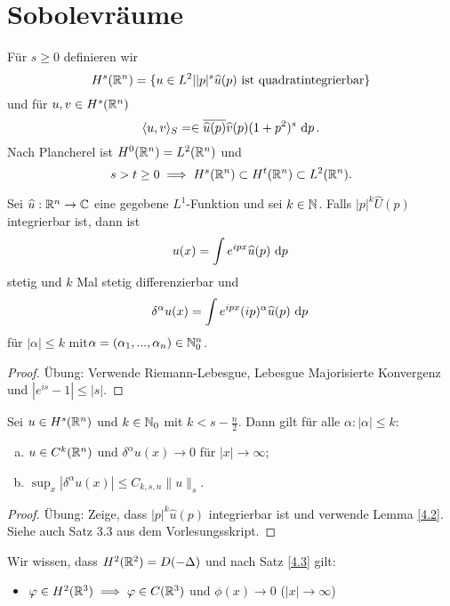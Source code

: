 \documentclass{mycourse}
\begin{document}
\section{Sobolevräume}
Für $s\ge 0$ definieren wir
\[
H^s(\R^n) = \{u \in L^2| |p|^s \hat u(p) \text{ ist quadratintegrierbar}\}
\]
und für $u,v\in H^s(\R^n)$
\[
\langle u, v \rangle_S = \in \overline{\hat u(p)} \hat v(p) (1+p^2)^s \, \dx[p].
\]
Nach Plancherel ist $H^0(\R^n)=L^2(\R^n)$ und
\[
s>t \ge 0 \implies H^s(\R^n) \subset H^t(\R^n) \subset L^2(\R^n).
\]
\begin{lem}\label{4.2}
Sei $\hat u: \R^n \to \C$ eine gegebene $L^1$-Funktion und sei $k\in \N$. Falls $|p|^k \hat U(p)$ integrierbar ist, dann ist
\[
u(x)=\int e^{ipx} \hat u(p) \, \dx[p]
\]
stetig und $k$ Mal stetig differenzierbar und
\[
\delta^\alpha u(x) = \int e^{ipx} (ip)^\alpha \hat u (p) \, \dx[p]
\]
für $|\alpha| \le k$ mit$\alpha=(\alpha_1,..., \alpha_n) \in \N_0^n$.
\end{lem}
\begin{proof}
Übung: Verwende Riemann-Lebesgue, Lebesgue Majorisierte Konvergenz und $|e^{is} -1|\le |s|$.
\end{proof}

\begin{st}\label{4.3}
Sei $u\in H^s(\R^n)$ und $k\in \N_0$ mit $k<s- \frac{n}{2}$. Dann gilt für alle $\alpha: |\alpha|\le k$:
\begin{enumerate}[a)]
\item $u\in C^k(\R^n)$ und $\delta^\alpha u(x) \to 0$ für $|x|\to \infty$;
\item $\sup_x |\delta^\alpha u(x)| \le C_{k,s,n} \|u\|_s.$
\end{enumerate}
\end{st}
\begin{proof}
Übung: Zeige, dass $|p|^k \hat u(p)$ integrierbar ist und verwende Lemma \ref{4.2}. Siehe auch Satz 3.3 aus dem Vorlesungsskript.
\end{proof}

\begin{ex*}
Wir wissen, dass $H^2(\R^2)=D(-\Delta)$ und nach Satz \ref{4.3} gilt:
\begin{itemize}
\item $\phi \in H^2(\R^3) \implies \phi \in C(\R^3)$ und $\phi(x)\to 0$ ($|x|\to \infty$)
\end{itemize}
\fixme
\end{ex*}
\end{document}
